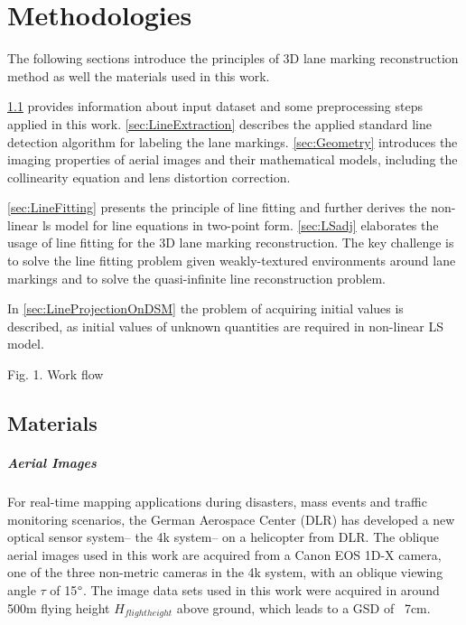 
\chapter{Methodologies}
\label{chap:k2}

The following sections introduce the principles of 3D lane marking reconstruction method as well the materials used in this work.%

\cref{sec:Materials} provides information about input dataset and some preprocessing steps applied in this work. \cref{sec:LineExtraction} describes the applied standard line detection algorithm for labeling the lane markings. \cref{sec:Geometry} introduces the imaging properties of aerial images and their mathematical models, including the collinearity equation and lens distortion correction.

\cref{sec:LineFitting} presents the principle of line fitting and further derives the non-linear \gls{ls} model for line equations in two-point form. \cref{sec:LSadj} elaborates the usage of line fitting for the 3D lane marking reconstruction.  The key challenge is to solve the line fitting problem given weakly-textured environments around lane markings and to solve the quasi-infinite line reconstruction problem.

In \cref{sec:LineProjectionOnDSM} the problem of acquiring initial values is described, as initial values of unknown quantities are required in non-linear LS model.

Fig. 1. Work flow %

\clearpage

\section{Materials}
\label{sec:Materials}


\paragraph{Aerial Images}
For real-time mapping applications during disasters, mass events and traffic monitoring scenarios, the German Aerospace Center (DLR) has developed a new optical sensor system-- the 4k system-- on a helicopter from DLR. The oblique aerial images used in this work are acquired from a Canon EOS 1D-X camera, one of the three non-metric cameras in the 4k system, with an oblique viewing angle $\tau$ of 15$\degree$. The image data sets used in this work were acquired in around 500m flying height $H_{flight height}$ above ground, which leads to a GSD of ~7cm. %


